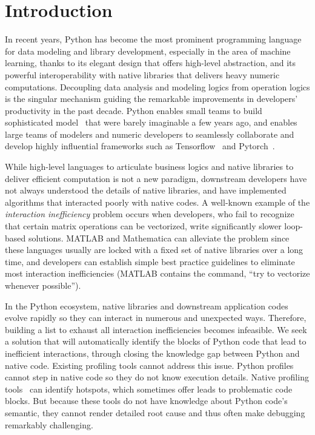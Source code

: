 \section{Introduction}
In recent years, Python has become the most prominent programming language for data modeling and library development, especially in the area of machine learning, thanks to its elegant design that offers high-level abstraction, and its powerful interoperability with native libraries that delivers heavy numeric computations. Decoupling data analysis and modeling logics from operation logics is the singular mechanism guiding the remarkable improvements in developers’ productivity in the past decade. Python enables small teams to build sophisticated model~\cite{meta} that were barely imaginable a few years ago, and enables large teams of modelers and numeric developers to seamlessly collaborate and develop highly influential frameworks such as Tensorflow~\cite{tensorflow2015-whitepaper} and Pytorch~\cite{paszke2017automatic}. %

While high-level languages to articulate business logics and native libraries to deliver efficient computation is not a new paradigm, downstream developers have not always understood the details of native libraries, and have implemented algorithms that interacted poorly with native codes. A well-known example of the \emph{interaction inefficiency} problem occurs when developers, who fail to recognize that certain matrix operations can be vectorized, write significantly slower loop-based solutions. MATLAB and Mathematica can alleviate the problem since these languages usually are locked with a fixed set of native libraries over a long time, and developers can establish simple best practice guidelines to eliminate most interaction inefficiencies (MATLAB contains the command, “try to vectorize whenever possible”). 


In the Python ecosystem, native libraries and downstream application codes evolve rapidly so they can interact in numerous and unexpected ways. Therefore, building a list to exhaust all interaction inefficiencies becomes infeasible. We seek a solution that will automatically identify the blocks of Python code that lead to inefficient interactions, through closing the knowledge gap between Python and native code. Existing profiling tools cannot address this issue. Python profiles~\cite{cProfile, guppy3, py-spy, pyflame, pyinstrument, pycallgraph, pprofile, memoryprofiler, austin} cannot step in native code so they do not know  execution details. Native profiling tools~\cite{reinders2005vtune, de2010new, nistor2013toddler, adhianto2010hpctoolkit, chabbi2012deadspy, wen2017redspy, loadspy, wen2018watching} can identify hotspots, which sometimes offer leads to problematic code blocks. But because these tools do not have knowledge about Python code's semantic, they cannot render detailed root cause and thus often make debugging remarkably challenging. 

